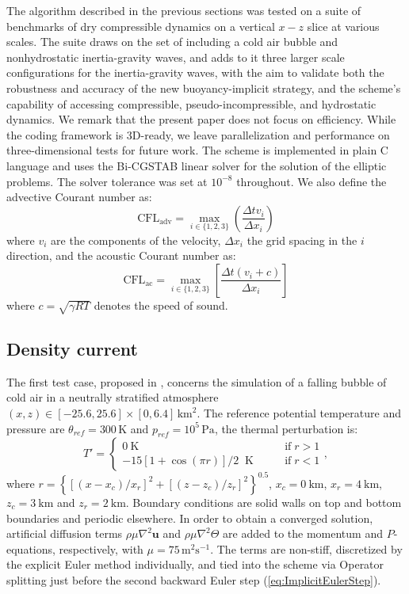 \documentclass[12pt,a4paper]{article}
\theoremstyle{definition}
\newcommand{\eq}[1]{(\ref{#1})}
\newcommand{\dt}{\Delta t}
\newcommand{\dx}{{\Delta x}}
\begin{document}
The algorithm described in the previous sections was tested on a suite of benchmarks of dry compressible dynamics on a vertical $x-z$ slice at various scales. The suite draws on the set of \cite{Benacchio2014,BenacchioEtAl2014} including a cold air bubble and nonhydrostatic inertia-gravity waves, and adds to it three larger scale configurations for the inertia-gravity waves, with the aim to validate both the robustness and accuracy of the new buoyancy-implicit strategy, and the scheme's capability of accessing compressible, pseudo-incompressible, and hydrostatic dynamics. We remark that the present paper does not focus on efficiency. While the coding framework is 3D-ready, we leave parallelization and performance on three-dimensional tests for future work. The scheme is implemented in plain C language and uses the Bi-CGSTAB linear solver \cite{Vandervorst1992} for the solution of the elliptic problems. The solver tolerance was set at $10^{-8}$ throughout. We also define the advective Courant number as:
%
\begin{equation}
\textrm{CFL}_\textrm{adv} = \max\limits_{i \in \{1,2,3\}}\left(\frac{\dt v_i}{\dx_i}\right)
\end{equation}
%
where $v_i$ are the components of the velocity, $\dx_i$ the grid spacing in the $i$ direction, and the acoustic Courant number as:
%
\begin{equation}
\textrm{CFL}_\textrm{ac} = \max\limits_{i \in \{1,2,3\}}\left[\frac{\dt (v_i+c)}{\dx_i}\right]
\end{equation}
%
where $c=\sqrt{\gamma RT}$ denotes the speed of sound.

\subsection{Density current}

The first test case, proposed in \cite{StrakaEtAl1993}, concerns the simulation of a falling bubble of cold air in a neutrally stratified atmosphere $(x,z)\in[-25.6,25.6]\times[0,6.4]\,\textrm{km}^2$. The reference potential temperature and pressure  are $\theta_{ref}=300\,\textrm{K}$ and $p_{ref}=10^5\,\textrm{Pa}$, the thermal perturbation is:
%
\begin{equation}
 T'=\begin{cases}
           0~\textrm{K} \qquad&\textrm{if}\;r>1\\
	   -15\left[1+\cos(\pi r)\right]/2 \;\;\textrm{K}\qquad&\textrm{if}\;r<1   
          \end{cases},
\end{equation} 
%
where $r=\left\{[(x-x_c)/x_r]^2+[(z-z_c)/z_r]^2\right\}^{0.5}$, $x_c=0~\textrm{km}$, $x_r=4~\textrm{km}$, $z_c=3~\textrm{km}$ and $z_r=2~\textrm{km}$. 
%
Boundary conditions are solid walls on top and bottom boundaries and periodic elsewhere. In order to obtain a converged solution, artificial diffusion terms $\rho\mu\nabla^2\mathbf{u}$ and
$\rho\mu\nabla^2\Theta$ are added to the momentum and $P$-equations, respectively, with $\mu=75\,\textrm{m$^2$s$^{-1}$}$. The terms are non-stiff, discretized by the explicit Euler method individually, and tied into the scheme via Operator splitting just before the second backward
Euler step \eq{eq:ImplicitEulerStep}.
\end{document}
